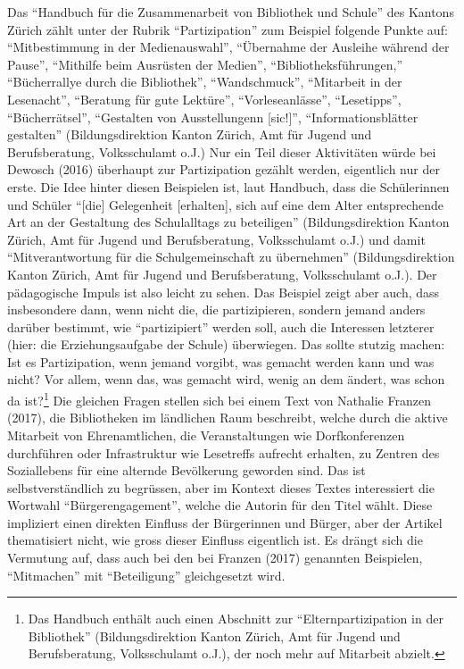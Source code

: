 \documentclass[a4paper,
fontsize=11pt,
oneside,
numbers=noperiodatend,
parskip=half-,
bibliography=totoc,
final
]{scrartcl}
\begin{document}
Das \enquote{Handbuch für die Zusammenarbeit von Bibliothek und Schule}
des Kantons Zürich zählt unter der Rubrik \enquote{Partizipation} zum
Beispiel folgende Punkte auf: \enquote{Mitbestimmung in der
Medienauswahl}, \enquote{Übernahme der Ausleihe während der Pause},
\enquote{Mithilfe beim Ausrüsten der Medien},
\enquote{Bibliotheksführungen,} \enquote{Bücherrallye durch die
Bibliothek}, \enquote{Wandschmuck}, \enquote{Mitarbeit in der
Lesenacht}, \enquote{Beratung für gute Lektüre},
\enquote{Vorleseanlässe}, \enquote{Lesetipps}, \enquote{Bücherrätsel},
\enquote{Gestalten von Ausstellungenn {[}sic!{]}},
\enquote{Informationsblätter gestalten} (Bildungsdirektion Kanton
Zürich, Amt für Jugend und Berufsberatung, Volksschulamt o.J.) Nur ein
Teil dieser Aktivitäten würde bei Dewosch (2016) überhaupt zur
Partizipation gezählt werden, eigentlich nur der erste. Die Idee hinter
diesen Beispielen ist, laut Handbuch, dass die Schülerinnen und Schüler
\enquote{{[}die{]} Gelegenheit {[}erhalten{]}, sich auf eine dem Alter
entsprechende Art an der Gestaltung des Schulalltags zu beteiligen}
(Bildungsdirektion Kanton Zürich, Amt für Jugend und Berufsberatung,
Volksschulamt o.J.) und damit \enquote{Mitverantwortung für die
Schulgemeinschaft zu übernehmen} (Bildungsdirektion Kanton Zürich, Amt
für Jugend und Berufsberatung, Volksschulamt o.J.). Der pädagogische
Impuls ist also leicht zu sehen. Das Beispiel zeigt aber auch, dass
insbesondere dann, wenn nicht die, die partizipieren, sondern jemand
anders darüber bestimmt, wie \enquote{partizipiert} werden soll, auch
die Interessen letzterer (hier: die Erziehungsaufgabe der Schule)
überwiegen. Das sollte stutzig machen: Ist es Partizipation, wenn jemand
vorgibt, was gemacht werden kann und was nicht? Vor allem, wenn das, was
gemacht wird, wenig an dem ändert, was schon da ist?\footnote{Das
  Handbuch enthält auch einen Abschnitt zur \enquote{Elternpartizipation
  in der Bibliothek} (Bildungsdirektion Kanton Zürich, Amt für Jugend
  und Berufsberatung, Volksschulamt o.J.), der noch mehr auf Mitarbeit
  abzielt.} Die gleichen Fragen stellen sich bei einem Text von Nathalie
Franzen (2017), die Bibliotheken im ländlichen Raum beschreibt, welche
durch die aktive Mitarbeit von Ehrenamtlichen, die Veranstaltungen wie
Dorfkonferenzen durchführen oder Infrastruktur wie Lesetreffs aufrecht
erhalten, zu Zentren des Soziallebens für eine alternde Bevölkerung
geworden sind. Das ist selbstverständlich zu begrüssen, aber im Kontext
dieses Textes interessiert die Wortwahl \enquote{Bürgerengagement},
welche die Autorin für den Titel wählt. Diese impliziert einen direkten
Einfluss der Bürgerinnen und Bürger, aber der Artikel thematisiert
nicht, wie gross dieser Einfluss eigentlich ist. Es drängt sich die
Vermutung auf, dass auch bei den bei Franzen (2017) genannten
Beispielen, \enquote{Mitmachen} mit \enquote{Beteiligung} gleichgesetzt
wird.
\end{document}
